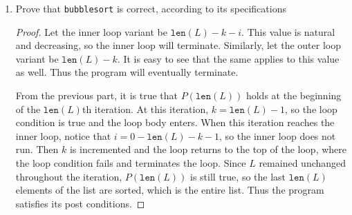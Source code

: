 \documentclass[11pt]{article}
\begin{document}
\begin{enumerate}[label=(\alph*)]
        \begin{proof}
            Define the outer loop invariant to be
            \[
                P(m) : \text{The last } m \text{ elements of } L \text{ are sorted.}
            \]
            In other words, it is true that \(L[\texttt{len}(L) - m] \leq L[\texttt{len}(L) - m + 1] \leq \cdots \leq L[\texttt{len}(L) - 1]\). It will be proven using simple induction that for \(m \in \{1, 2,..., \texttt{len}(L) + 1\}\), \(P(m)\) is true.

            \textbf{Base Case.} Let \(m=1\). When the loop is first entered, the last element of \(L\) is obviously sorted. Thus \(P(1)\) holds true.

            \textbf{Induction Hypothesis.} Suppose that for some \(m \in \{1,..., \texttt{len}(L)\}\), \(P(m)\) is true at the beginning of the \(m\)th iteration. Notice that \(k\) is initialized to be 0 and is incremented every outer loop iteration. Thus \(k = m-1 < \texttt{len}(L)\), so the loop body is entered.

            \textbf{Induction Step.} Running the \(m\)th iteration, \(i\) is initialized to be 0 and the inner loop runs. By the previous part, \(Q(\texttt{len}(L) - m + 2)\) is true at the beginning of the \((\texttt{len}(L) - m + 2)\)th iteration. Recall that at the beginning of this iteration, \(i = \texttt{len}(L) - m + 1 = \texttt{len}(L) - k\), so the loop terminates. Thus before line 13, \(L[\texttt{len}(L) - m]\leq L[\texttt{len}(L) - m + 1]\), as \(\texttt{len}(L) - m < i\). After line 13, the \(m+1\)th iteration begins.

            By the induction hypothesis, there is a typo lol.
        \end{proof}

        \item Prove that \verb|bubblesort| is correct, according to its specifications
        
        \begin{proof}
            Let the inner loop variant be \(\texttt{len}(L) - k - i\). This value is natural and decreasing, so the inner loop will terminate. Similarly, let the outer loop variant be \(\texttt{len}(L) - k\). It is easy to see that the same applies to this value as well. Thus the program will eventually terminate.

            From the previous part, it is true that \(P(\texttt{len}(L))\) holds at the beginning of the \(\texttt{len}(L)\)th iteration. At this iteration, \(k=\texttt{len}(L) - 1\), so the loop condition is true and the loop body enters. When this iteration reaches the inner loop, notice that \(i = 0 - \texttt{len}(L) - k - 1\), so the inner loop does not run. Then \(k\) is incremented and the loop returns to the top of the loop, where the loop condition fails and terminates the loop. Since \(L\) remained unchanged throughout the iteration, \(P(\texttt{len}(L))\) is still true, so the last \(\texttt{len}(L)\) elements of the list are sorted, which is the entire list. Thus the program satisfies its post conditions.
        \end{proof}
    \end{enumerate}
\end{document}
